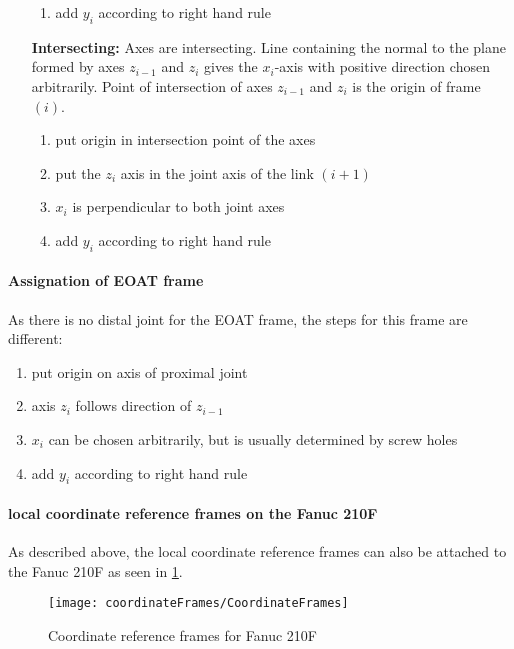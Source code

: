 \begin{itemize}[wide=\parindent]
\begin{enumerate}[label=\emph{\alph*)}]
		\item add $y_i$ according to right hand rule
	\end{enumerate}
	\item[\textbf{Intersecting:}] Axes are intersecting. Line containing the normal to the plane formed by axes $z_{i-1}$ and  $z_i$ gives the $x_i$-axis with positive direction chosen arbitrarily. Point of intersection of  axes $z_{i-1}$  and  $z_i$ is the origin of frame $(i)$.
		\begin{enumerate}[label=\emph{\alph*)}]
		\item put origin in intersection point of the axes
		\item put the $z_i$ axis in the joint axis of the link $(i+1)$
		\item $x_i$ is perpendicular to both joint axes
		\item add $y_i$ according to right hand rule
	\end{enumerate}
\end{itemize}

\paragraph{Assignation of \ac{EOAT} frame}
As there is no distal joint for the \ac{EOAT} frame, the steps for this frame are different:

\begin{enumerate}[label=\emph{\alph*)}]
	\item put origin on axis of proximal joint 
	\item axis $z_i$ follows direction of $z_{i-1}$
	\item $x_i$ can be chosen arbitrarily, but is usually determined by screw holes
	\item add $y_i$ according to right hand rule
\end{enumerate}

\paragraph{local coordinate reference frames on the Fanuc 210F}

As described above, the local coordinate reference frames can also be attached to the Fanuc 210F as seen in \ref{fig:RefFrame}. 

\begin{figure}[h]
	\texttt{[image: coordinateFrames/CoordinateFrames]}
	\caption{Coordinate reference frames for Fanuc 210F}
	\label{fig:RefFrame}
\end{figure}


